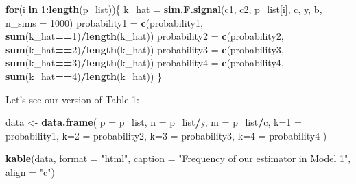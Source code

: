 \documentclass[
]{article}
\newenvironment{Shaded}{\begin{snugshade}}{\end{snugshade}}
\newcommand{\AttributeTok}[1]{\textcolor[rgb]{0.13,0.29,0.53}{#1}}
\newcommand{\ControlFlowTok}[1]{\textcolor[rgb]{0.13,0.29,0.53}{\textbf{#1}}}
\newcommand{\DecValTok}[1]{\textcolor[rgb]{0.00,0.00,0.81}{#1}}
\newcommand{\FunctionTok}[1]{\textcolor[rgb]{0.13,0.29,0.53}{\textbf{#1}}}
\newcommand{\NormalTok}[1]{#1}
\newcommand{\OtherTok}[1]{\textcolor[rgb]{0.56,0.35,0.01}{#1}}
\newcommand{\SpecialCharTok}[1]{\textcolor[rgb]{0.81,0.36,0.00}{\textbf{#1}}}
\newcommand{\StringTok}[1]{\textcolor[rgb]{0.31,0.60,0.02}{#1}}
\begin{document}
\begin{Shaded}
\begin{Highlighting}[]
\ControlFlowTok{for}\NormalTok{(i }\ControlFlowTok{in} \DecValTok{1}\SpecialCharTok{:}\FunctionTok{length}\NormalTok{(p\_list))\{}
\NormalTok{  k\_hat }\OtherTok{=} \FunctionTok{sim.F.signal}\NormalTok{(c1, c2, p\_list[i], c, y, b, }\AttributeTok{n\_sims =} \DecValTok{1000}\NormalTok{)}
\NormalTok{  probability1 }\OtherTok{=} \FunctionTok{c}\NormalTok{(probability1, }\FunctionTok{sum}\NormalTok{(k\_hat}\SpecialCharTok{==}\DecValTok{1}\NormalTok{)}\SpecialCharTok{/}\FunctionTok{length}\NormalTok{(k\_hat))}
\NormalTok{  probability2 }\OtherTok{=} \FunctionTok{c}\NormalTok{(probability2, }\FunctionTok{sum}\NormalTok{(k\_hat}\SpecialCharTok{==}\DecValTok{2}\NormalTok{)}\SpecialCharTok{/}\FunctionTok{length}\NormalTok{(k\_hat))}
\NormalTok{  probability3 }\OtherTok{=} \FunctionTok{c}\NormalTok{(probability3, }\FunctionTok{sum}\NormalTok{(k\_hat}\SpecialCharTok{==}\DecValTok{3}\NormalTok{)}\SpecialCharTok{/}\FunctionTok{length}\NormalTok{(k\_hat))}
\NormalTok{  probability4 }\OtherTok{=} \FunctionTok{c}\NormalTok{(probability4, }\FunctionTok{sum}\NormalTok{(k\_hat}\SpecialCharTok{==}\DecValTok{4}\NormalTok{)}\SpecialCharTok{/}\FunctionTok{length}\NormalTok{(k\_hat))}
\NormalTok{\}}
\end{Highlighting}
\end{Shaded}

Let's see our version of Table 1:

\begin{Shaded}
\begin{Highlighting}[]
\NormalTok{data }\OtherTok{\textless{}{-}} \FunctionTok{data.frame}\NormalTok{(}
  \AttributeTok{p =}\NormalTok{ p\_list,}
  \AttributeTok{n =}\NormalTok{ p\_list}\SpecialCharTok{/}\NormalTok{y,}
  \AttributeTok{m =}\NormalTok{ p\_list}\SpecialCharTok{/}\NormalTok{c,}
  \StringTok{\textasciigrave{}}\AttributeTok{k=1}\StringTok{\textasciigrave{}} \OtherTok{=}\NormalTok{ probability1,}
  \StringTok{\textasciigrave{}}\AttributeTok{k=2}\StringTok{\textasciigrave{}} \OtherTok{=}\NormalTok{ probability2,}
  \StringTok{\textasciigrave{}}\AttributeTok{k=3}\StringTok{\textasciigrave{}} \OtherTok{=}\NormalTok{ probability3,}
  \StringTok{\textasciigrave{}}\AttributeTok{k=4}\StringTok{\textasciigrave{}} \OtherTok{=}\NormalTok{ probability4}
\NormalTok{)}

\FunctionTok{kable}\NormalTok{(data, }\AttributeTok{format =} \StringTok{"html"}\NormalTok{, }\AttributeTok{caption =} \StringTok{"Frequency of our estimator in Model 1"}\NormalTok{, }\AttributeTok{align =} \StringTok{"c"}\NormalTok{)}
\end{Highlighting}
\end{Shaded}
\end{document}
